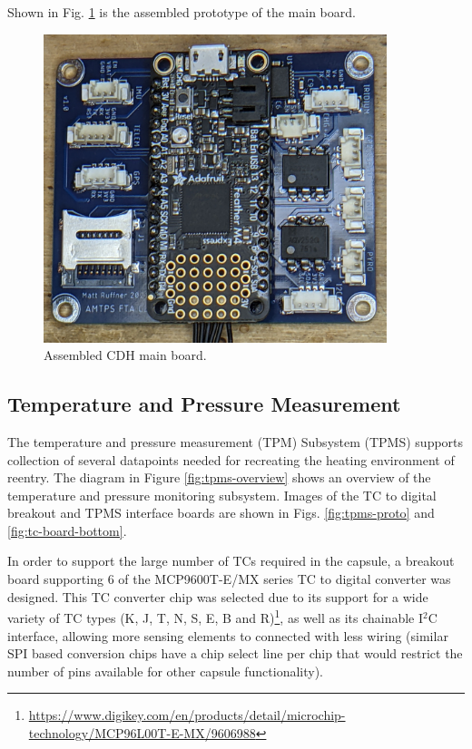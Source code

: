 \documentclass{article}
\begin{document}
Shown in Fig. \ref{fig:cdh-prototype} is the assembled prototype of the main board.
\begin{figure}[h!]
	\centering
	\includegraphics[width=10cm]{images/main-board}
	\caption{Assembled CDH main board.}
	\label{fig:cdh-prototype}
\end{figure}


\subsection{Temperature and Pressure Measurement}
The temperature and pressure measurement (TPM) Subsystem (TPMS) supports collection of several datapoints needed for recreating the heating environment of reentry. The diagram in Figure \ref{fig:tpms-overview} shows an overview of the temperature and pressure monitoring subsystem. Images of the TC to digital breakout and TPMS interface boards are shown in Figs. \ref{fig:tpms-proto} and \ref{fig:tc-board-bottom}.

In order to support the large number of TCs required in the capsule, a breakout board supporting 6 of the MCP9600T-E/MX series TC to digital converter was designed. This TC converter chip was selected due to its support for a wide variety of TC types (K, J, T, N, S, E, B and R)\footnote{\url{https://www.digikey.com/en/products/detail/microchip-technology/MCP96L00T-E-MX/9606988}}, as well as its chainable I$^2$C interface, allowing more sensing elements to connected with less wiring (similar SPI based conversion chips have a chip select line per chip that would restrict the number of pins available for other capsule functionality).
\end{document}
